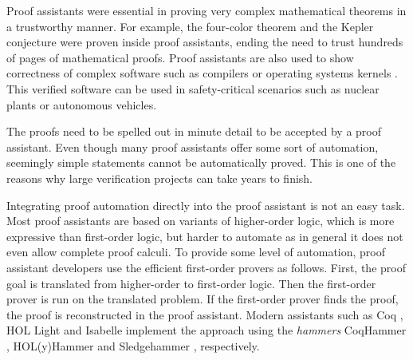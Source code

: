 Proof assistants were essential in proving very complex mathematical theorems in a
trustworthy manner. For example, the four-color theorem \cite{gg-2008-four-color}
and the Kepler conjecture \cite{th-2015-kepler} were proven inside proof assistants,
ending the need to trust hundreds of pages of mathematical proofs. Proof
assistants are also used to show correctness of complex software such as
compilers \cite{xl-09-compcert} or operating systems kernels \cite{gk-09-sel4}.
This verified software can be used in safety-critical scenarios such as nuclear
plants or autonomous vehicles.

The proofs need to be spelled out in minute detail to be accepted by a proof assistant.
Even though many proof assistants offer some sort of automation, seemingly simple
statements cannot be automatically proved. This is one of the reasons why large
verification projects can take years to finish.

Integrating proof automation directly into the proof assistant is not an easy task.
Most proof assistants are based on variants of higher-order logic, which is more
expressive than first-order logic, but harder to automate as in general it does not even allow complete
proof calculi. To provide some level of automation, proof assistant developers
use the efficient first-order provers as follows. First, the proof goal is
translated from higher-order to first-order logic. Then the first-order prover
is run on the translated problem. If the first-order prover finds the proof, the
proof is reconstructed in the proof assistant. Modern assistants such as Coq \cite{bc-04-coq}, HOL Light \cite{jh-09-hol-light}
and Isabelle \cite{lc-88-isabelle} implement the approach using the \emph{hammers} CoqHammer
\cite{ck-18-coqhammer}, HOL(y)Hammer \cite{ku-15-holyhammer} and Sledgehammer
\cite{bn-10-sh}, respectively. 

